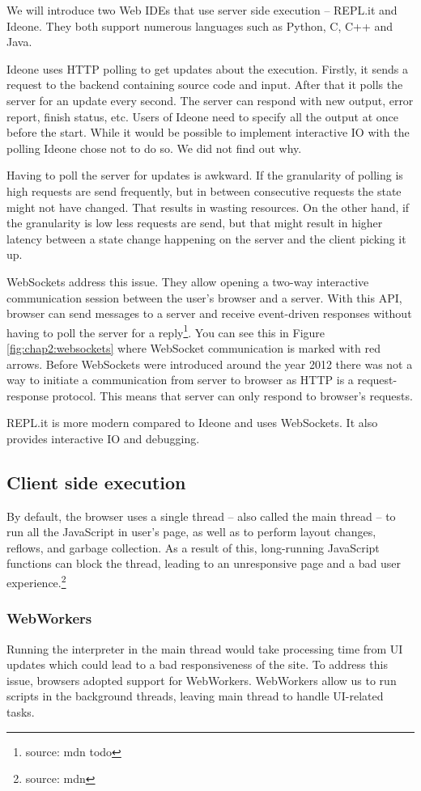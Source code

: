 We will introduce two Web IDEs that use server side execution -- REPL.it and Ideone. They both support numerous languages such
as Python, C, C++ and Java.

Ideone uses HTTP polling to get updates about the execution. Firstly, it sends a request to the backend containing source code and input.
After that it polls the server for an update every second. The server can respond with new output, error report, finish status, etc. Users of Ideone need to
specify all the output at once before the start. While it would be possible to implement interactive IO with the polling Ideone chose not to do so.
We did not find out why.

Having to poll the server for updates is awkward. If the granularity of polling is high requests are send frequently, but
in between consecutive requests the state might not have changed. That results in wasting resources. On the other hand, if the granularity is low less
requests are send, but that might result in higher latency between a state change happening on the server and the client picking it up.

WebSockets address this issue. They allow opening a two-way interactive communication session between the user's browser and a server.
With this API, browser can send messages to a server and receive event-driven responses without having to poll the server for a reply\footnote{source: mdn todo}.
You can see this in Figure \ref{fig:chap2:websockets} where WebSocket communication is marked with red arrows.
Before WebSockets were introduced around the year 2012 there was not a way to initiate a communication from server to browser as HTTP is a request-response
protocol. This means that server can only respond to browser's requests.

REPL.it is more modern compared to Ideone and uses WebSockets. It also provides interactive IO and debugging.

\subsection{Client side execution}
By default, the browser uses a single thread -- also called the main thread -- to run all the JavaScript in user's page, as well as to perform layout
changes, reflows, and garbage collection. As a result of this, long-running JavaScript functions can block the thread, leading to an unresponsive page and
a bad user experience.\footnote{source: mdn}

\subsubsection{WebWorkers}
Running the interpreter in the main thread would take processing time from UI updates which could lead to a bad responsiveness of the site. To
address this issue, browsers adopted support for WebWorkers. WebWorkers allow us to run scripts in the background threads, leaving main thread
to handle UI-related tasks.

